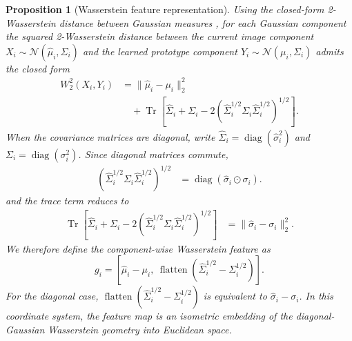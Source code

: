 \documentclass[journal]{IEEEtran}
\DeclareMathOperator{\flatten}{flatten}
\newtheorem{proposition}{Proposition}
\begin{document}
\begin{proposition}[Wasserstein feature representation]
Using the closed-form 2-Wasserstein distance between Gaussian measures \cite{wgan}, for each Gaussian component the squared 2-Wasserstein distance between the current image component \(X_i \sim \mathcal{N}(\hat{\mu}_i,\hat{\Sigma}_i)\) and the learned prototype component \(Y_i \sim \mathcal{N}(\mu_i,\Sigma_i)\) admits the closed form
\begin{align}
W_2^2(X_i,Y_i)
&= \|\hat{\mu}_i - \mu_i\|_2^2 \nonumber\\
&\quad + \operatorname{Tr}\!\left[\hat{\Sigma}_i + \Sigma_i - 2\left(\hat{\Sigma}_i^{1/2}\Sigma_i\hat{\Sigma}_i^{1/2}\right)^{1/2}\right].
\end{align}
When the covariance matrices are diagonal, write \(\hat{\Sigma}_i = \operatorname{diag}(\hat{\sigma}_i^2)\) and \(\Sigma_i = \operatorname{diag}(\sigma_i^2)\). Since diagonal matrices commute,
\begin{align}
\left(\hat{\Sigma}_i^{1/2}\Sigma_i\hat{\Sigma}_i^{1/2}\right)^{1/2}
&= \operatorname{diag}(\hat{\sigma}_i \odot \sigma_i).
\end{align}
and the trace term reduces to
\begin{align}
\operatorname{Tr}\!\left[\hat{\Sigma}_i + \Sigma_i - 2\left(\hat{\Sigma}_i^{1/2}\Sigma_i\hat{\Sigma}_i^{1/2}\right)^{1/2}\right]
&= \|\hat{\sigma}_i - \sigma_i\|_2^2.
\end{align}
We therefore define the component-wise Wasserstein feature as
\[
g_i = [\hat{\mu}_i - \mu_i,\ \flatten(\hat{\Sigma}_i^{1/2} - \Sigma_i^{1/2})].
\]
For the diagonal case, \(\flatten(\hat{\Sigma}_i^{1/2} - \Sigma_i^{1/2})\) is equivalent to \(\hat{\sigma}_i - \sigma_i\). In this coordinate system, the feature map is an isometric embedding of the diagonal-Gaussian Wasserstein geometry into Euclidean space.

\end{proposition}
\end{document}
